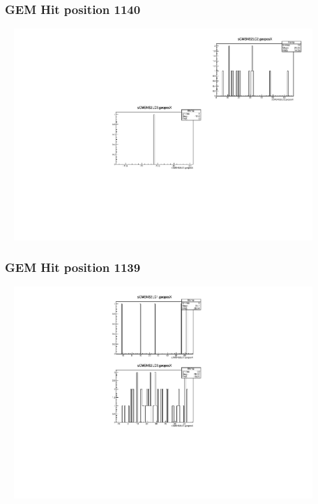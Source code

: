 \documentclass[slidestop,compress,mathserif]{beamer}
\begin{document}
\begin{frame}\frametitle{GEM Hit position 1140}
	 \includegraphics[width=12cm,height=8cm]{GEM_Hit_position_1140.pdf}
\end{frame}
\begin{frame}\frametitle{GEM Hit position 1139}
	 \includegraphics[width=12cm,height=8cm]{GEM_Hit_position_1139.pdf}
\end{frame}
\end{document}
